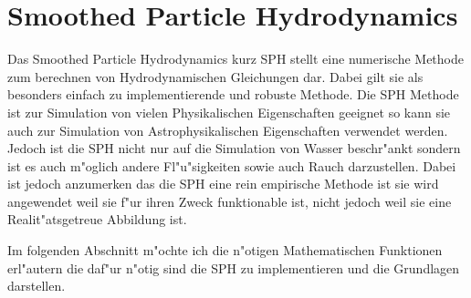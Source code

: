 \section{Smoothed Particle Hydrodynamics}
\label{sec:sph}

Das Smoothed Particle Hydrodynamics kurz SPH stellt eine numerische Methode %
zum berechnen von Hydrodynamischen Gleichungen dar. Dabei gilt sie als %
besonders einfach zu implementierende und robuste Methode. %
Die SPH Methode ist zur Simulation von vielen Physikalischen Eigenschaften %
geeignet so kann sie auch zur Simulation von Astrophysikalischen Eigenschaften %
verwendet werden. %
Jedoch ist die SPH nicht nur auf die Simulation von Wasser beschr"ankt sondern %
ist es auch m"oglich andere Fl"u"sigkeiten sowie auch Rauch darzustellen. %
Dabei ist jedoch anzumerken das die SPH eine rein empirische Methode ist %
sie wird angewendet weil sie f"ur ihren Zweck funktionable ist, %
nicht jedoch weil sie eine Realit"atsgetreue Abbildung ist. %


Im folgenden Abschnitt m"ochte ich die n"otigen Mathematischen Funktionen erl"autern %
die daf"ur n"otig sind die SPH zu implementieren und die Grundlagen darstellen. %



